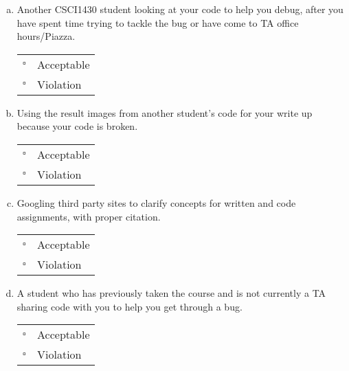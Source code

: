 \documentclass[11pt]{article}
\begin{document}
\begin{enumerate}[(a)]
\item
Another CSCI1430 student looking at your code to help you debug, after you have spent time trying to tackle the bug or have come to TA office hours/Piazza.

\begin{tabular}[h]{ll}
$\square$ & Acceptable \\
$\square$ & Violation \\
\end{tabular}

\item
Using the result images from another student's code for your write up because your code is broken.

\begin{tabular}[h]{ll}
$\square$ & Acceptable \\
$\square$ & Violation \\
\end{tabular}

\item
Googling third party sites to clarify concepts for written and code assignments, with proper citation.

\begin{tabular}[h]{ll}
$\square$ & Acceptable \\
$\square$ & Violation \\
\end{tabular}

\item
A student who has previously taken the course and is not currently a TA sharing code with you to help you get through a bug.

\begin{tabular}[h]{ll}
$\square$ & Acceptable \\
$\square$ & Violation \\
\end{tabular}

\end{enumerate}




\pagebreak
\end{document}
